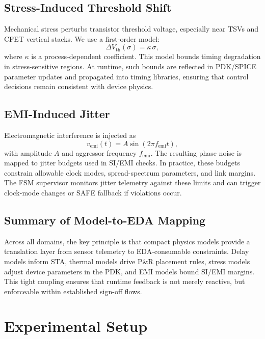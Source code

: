 \documentclass[conference]{IEEEtran}
\begin{document}
\subsection{Stress-Induced Threshold Shift}
Mechanical stress perturbs transistor threshold voltage, especially near TSVs and CFET vertical stacks. We use a first-order model:
\begin{equation}
\Delta V_{\mathrm{th}}(\sigma)=\kappa\,\sigma,
\end{equation}
where $\kappa$ is a process-dependent coefficient. This model bounds timing degradation in stress-sensitive regions. At runtime, such bounds are reflected in PDK/SPICE parameter updates and propagated into timing libraries, ensuring that control decisions remain consistent with device physics.

\subsection{EMI-Induced Jitter}
Electromagnetic interference is injected as
\begin{equation}
v_{\mathrm{emi}}(t)=A\sin (2\pi f_{\mathrm{emi}} t),
\end{equation}
with amplitude $A$ and aggressor frequency $f_{\mathrm{emi}}$. The resulting phase noise is mapped to jitter budgets used in SI/EMI checks. In practice, these budgets constrain allowable clock modes, spread-spectrum parameters, and link margins. The FSM supervisor monitors jitter telemetry against these limits and can trigger clock-mode changes or SAFE fallback if violations occur.

\subsection{Summary of Model-to-EDA Mapping}
Across all domains, the key principle is that compact physics models provide a translation layer from sensor telemetry to EDA-consumable constraints. Delay models inform STA, thermal models drive P\&R placement rules, stress models adjust device parameters in the PDK, and EMI models bound SI/EMI margins. This tight coupling ensures that runtime feedback is not merely reactive, but enforceable within established sign-off flows.

\section{Experimental Setup}
\end{document}
